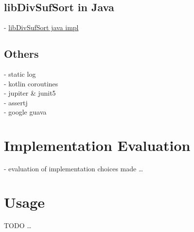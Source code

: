 \subsection{libDivSufSort in Java}
- \href{https://github.com/flanglet/kanzi/releases}{libDivSufSort java impl}\\
\subsection{Others}
- static log\\
- kotlin coroutines\\
- jupiter \& junit5\\
- assertj\\
- google guava\\


\section{Implementation Evaluation}
\label{ch:Implementation:sec:Implementation Evaluation}
- evaluation of implementation choices made
\ldots


\section{Usage}
\label{ch:Implementation:sec:usage}
TODO
\ldots
